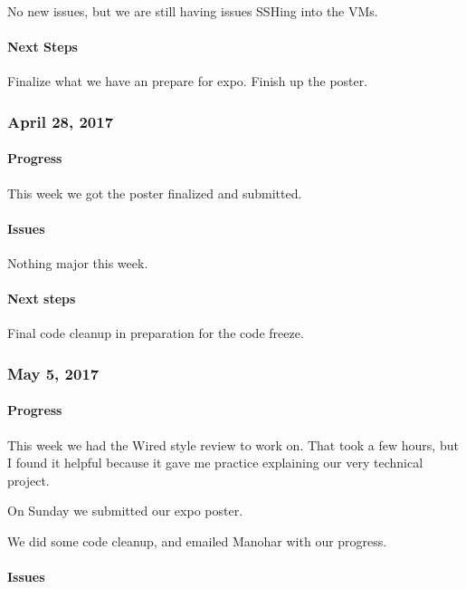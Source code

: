 \documentclass[10pt,onecolumn,journal,draftclsnofoot]{IEEEtran}
\begin{document}
No new issues, but we are still having issues SSHing into the VMs.

\paragraph{Next Steps} 

Finalize what we have an prepare for expo. Finish up the poster.

\subsubsection{April 28, 2017} 

\paragraph{Progress} 

This week we got the poster finalized and submitted.

\paragraph{Issues} 

Nothing major this week.

\paragraph{Next steps} 

Final code cleanup in preparation for the code freeze.

\subsubsection{May 5, 2017} 

\paragraph{Progress} 

This week we had the Wired style review to work on. That took a few
hours, but I found it helpful because it gave me practice explaining our
very technical project.

On Sunday we submitted our expo poster.

We did some code cleanup, and emailed Manohar with our progress.

\paragraph{Issues} 
\end{document}
